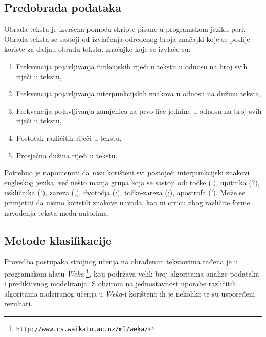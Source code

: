 \documentclass[10pt, a4paper]{article}
\begin{document}



\subsection{Predobrada podataka}
Obrada teksta je izvršena pomoću skripte pisane u programskom jeziku perl. Obrada teksta se sastoji od izvlačenja određenog broja značajki koje se poslije koriste za daljnu obradu teksta.
značajke koje se izvlače su:
\begin{enumerate}
\item Frekvencija pojavljivanja funkcijskih riječi u tekstu u odnosu na broj svih riječi u tekstu,
\item Frekvencija pojavljivanja interpunkcijskih znakova u odnosu na dužinu teksta,
\item Frekvencija pojavljivanja zamjenica za prvo lice jednine u odnosu na broj svih riječi u tekstu,
\item Postotak različitih riječi u tekstu,
\item Prosječna dužina riječi u tekstu.
\end{enumerate}
Potrebno je napomenuti da nisu korišteni svi postojeći interpunkcijski znakovi engleskog jezika, već nešto manja grupa koja se sastoji od:
točke (.),
upitnika (?),
uskličnika (!),
zareza (,),
dvotočja (:),
točke-zareza (;),
apostrofa (').
Može se primjetiti da nismo koristili znakove navoda, kao ni crticu zbog različite forme navođenja teksta među autorima.

\subsection{Metode klasifikacije}

Provedba postupaka strojnog učenja na obrađenim tekstovima rađena je u programskom alatu \emph{Weka} \footnote{\texttt{http://www.cs.waikato.ac.nz/ml/weka/}}, koji podržava velik broj algoritama analize podataka i prediktivnog modeliranja. S obzirom na jednostavnost uporabe različitih algoritama nadziranog učenja u \emph{Weka}-i korišteno ih je nekoliko te su uspoređeni rezultati.  
\end{document}
